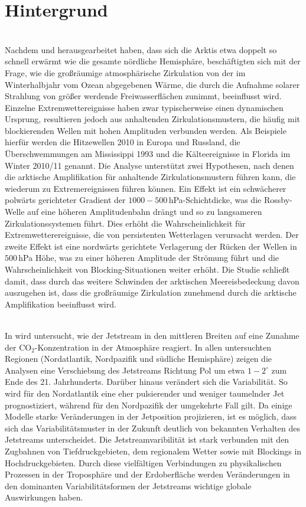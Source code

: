 \chapter{Hintergrund} \label{ch:hintergrund}

\citet{francis-2012} \\
Nachdem \citet{screen-2010} und \citet{serreze-2009} herausgearbeitet haben, dass sich die Arktis etwa doppelt so schnell erwärmt wie die gesamte nördliche Hemisphäre, beschäftigten sich \citet{francis-2012} mit der Frage, wie die großräumige atmosphärische Zirkulation von der im Winterhalbjahr vom Ozean abgegebenen Wärme, die durch die Aufnahme solarer Strahlung von größer werdende Freiwasserflächen zunimmt, beeinflusst wird. Einzelne Extremwettereignisse haben zwar typischerweise einen dynamischen Ursprung, resultieren jedoch aus anhaltenden Zirkulationsmustern, die häufig mit blockierenden Wellen mit hohen Amplituden verbunden werden. Als Beispiele hierfür werden die Hitzewellen 2010 in Europa und Russland, die Überschwemmungen am Mississippi 1993 und die Kälteereignisse in Florida im Winter 2010/11 genannt. 
Die Analyse unterstützt zwei Hypothesen, nach denen die arktische Amplifikation für anhaltende Zirkulationsmustern führen kann, die wiederum zu Extremereignissen führen können. Ein Effekt ist ein schwächerer polwärts gerichteter Gradient der $1000-500\,$hPa-Schichtdicke, was die Rossby-Welle auf eine höheren Amplitudenbahn drängt und so zu langsameren Zirkulationssystemen führt. Dies erhöht die Wahrscheinlichkeit für Extremwetterereignisse, die von persistenten Wetterlagen verursacht werden. Der zweite Effekt ist eine nordwärts gerichtete Verlagerung der Rücken der Wellen in $500\,$hPa Höhe, was zu einer höheren Amplitude der Strömung führt und die Wahrscheinlichkeit von Blocking-Situationen weiter erhöht. Die Studie schließt damit, dass durch das weitere Schwinden der arktischen Meereisbedeckung davon auszugehen ist, dass die großräumige Zirkulation zunehmend durch die arktische Amplifikation beeinflusst wird. 

\citet{barnes-2013-b}\\
In \citet{barnes-2013-b} wird untersucht, wie der Jetstream in den mittleren Breiten auf eine Zunahme der CO$_2$-Konzentration in der Atmosphäre reagiert. In allen untersuchten Regionen (Nordatlantik, Nordpazifik und südliche Hemisphäre) zeigen die Analysen eine Verschiebung des Jetstreams Richtung Pol um etwa $1-2^{\circ}$  zum Ende des 21. Jahrhunderts. Darüber hinaus verändert sich die Variabilität. So wird für den Nordatlantik eine eher pulsierender und weniger taumelnder Jet prognostiziert, während für den Nordpazifik der umgekehrte Fall gilt. Da einige Modelle starke Veränderungen in der Jetposition projizieren, ist es möglich, dass sich das Variabilitätsmuster in der Zukunft deutlich von bekannten Verhalten des Jetstreams unterscheidet. Die Jetstreamvaribilität ist stark verbunden mit den Zugbahnen von Tiefdruckgebieten, dem regionalem Wetter sowie mit Blockings in Hochdruckgebieten. Durch diese vielfältigen Verbindungen zu physikalischen Prozessen in der Troposphäre und der Erdoberfläche werden Veränderungen in den dominanten Variabilitätsformen der Jetstreams wichtige globale Auswirkungen haben.

